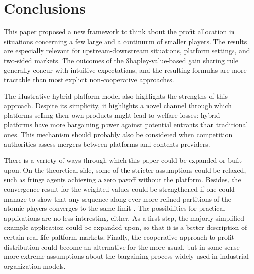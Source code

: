 \documentclass[a4paper]{article}
\begin{document}
\section{Conclusions}

This paper proposed a new framework to think about the profit allocation in situations concerning a few large and a continuum of smaller players. The results are especially relevant for upstream-downstream situations, platform settings, and two-sided markets. The outcomes of the Shapley-value-based gain sharing rule generally concur with intuitive expectations, and the resulting formulas are more tractable than most explicit non-cooperative approaches.

The illustrative hybrid platform model also highlights the strengths of this approach. Despite its simplicity, it highlights a novel channel through which platforms selling their own products might lead to welfare losses: hybrid platforms have more bargaining power against potential entrants than traditional ones. This mechanism should probably also be considered when competition authorities assess mergers between platforms and contents providers.

There is a variety of ways through which this paper could be expanded or built upon. On the theoretical side, some of the stricter assumptions could be relaxed, such as fringe agents achieving a zero payoff without the platform. Besides, the convergence result for the weighted values could be strengthened if one could manage to show that any sequence along ever more refined partitions of the atomic players converges to the same limit \parencite[à la][]{fogelman1980asymptotic}. The possibilities for practical applications are no less interesting, either. As a first step, the majorly simplified example application could be expanded upon, so that it is a better description of certain real-life paltform markets. Finally, the cooperative approach to profit distribution could become an alternative for the more usual, but in some sense more extreme assumptions about the bargaining process widely used in industrial organization models.

\end{document}
